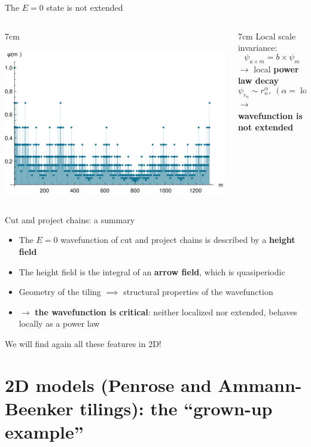 \documentclass[xcolor=x11names,compress,professionalfonts, aspectratio=169]{beamer}
\renewcommand{\(}{\begin{columns}}
\renewcommand{\)}{\end{columns}}
\newcommand{\<}[1]{\begin{column}{#1}}
\renewcommand{\>}{\end{column}}
\begin{document}
\begin{frame}{The $E=0$ state is not extended}
{

\centering

}

\begin{columns}
\<{7cm}
{\centering
\includegraphics[scale=.5]{img/wavefunction.pdf}

}
\>

\<{7cm}
Local scale invariance:
\[
	\psi_{a \times m} = b \times \psi_{m} 
\]
$\rightarrow$ local \textbf{power law decay}
\[
\psi_{r_n} \sim r_n^\alpha, ~(\alpha = \log b/\log a)
\]
$\rightarrow$ \textbf{wavefunction is not extended}
\>
\end{columns}

\end{frame}

\begin{frame}{Cut and project chains: a summary}
\begin{itemize}
	\item The $E=0$ wavefunction of cut and project chains is described by a \textbf{height field}
	\item The height field is the integral of an \textbf{arrow field}, which is quasiperiodic
	\item Geometry of the tiling $\implies$ structural properties of the wavefunction
	\item $\rightarrow$ \textbf{the wavefunction is critical}: neither localized nor extended, behaves locally as a power law
\end{itemize}
We will find again all these features in 2D!
\end{frame}

\section{2D models (Penrose and Ammann-Beenker tilings): the ``grown-up example''}
\end{document}
